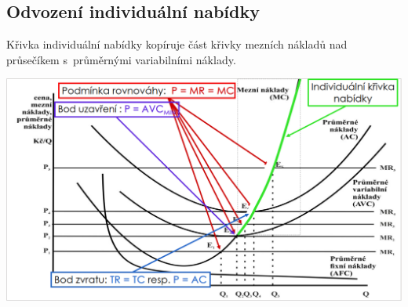 \subsection{Odvození individuální nabídky}
Křivka individuální nabídky kopíruje část křivky mezních nákladů nad průsečíkem 
s~průměrnými variabilními náklady.

\includegraphics[width=16cm]{images/09_indiv_nabidka.png}